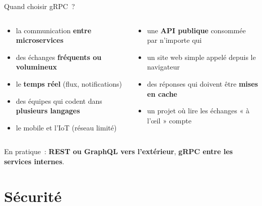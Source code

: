 \documentclass[aspectratio=169,11pt]{beamer}
\begin{document}
\begin{frame}{Quand choisir gRPC~?}
  \begin{columns}[T,onlytextwidth]
    \begin{carte}[ggreen]
      \begin{itemize}\small
        \item la communication \textbf{entre microservices}
        \item des échanges \textbf{fréquents ou volumineux}
        \item le \textbf{temps réel} (flux, notifications)
        \item des équipes qui codent dans \textbf{plusieurs langages}
        \item le mobile et l'IoT (réseau limité)
      \end{itemize}
    \end{carte}
    \begin{carte}[gamber]
      \begin{itemize}\small
        \item une \textbf{API publique} consommée par n'importe qui
        \item un site web simple appelé depuis le navigateur
        \item des réponses qui doivent être \textbf{mises en cache}
        \item un projet où lire les échanges « à l'œil » compte
      \end{itemize}
    \end{carte}
  \end{columns}
  \vspace{0.15cm}
  \centering\small En pratique~: \textbf{REST ou GraphQL vers l'extérieur}, \textbf{gRPC entre les services internes}.
\end{frame}

\section{Sécurité}
\end{document}
